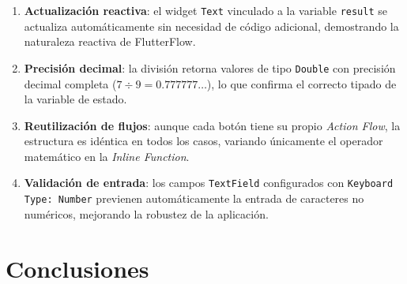 \documentclass[12pt,a4paper]{article}
\begin{document}
\begin{enumerate}
  \item \textbf{Actualización reactiva}: el widget \texttt{Text} vinculado a la variable \texttt{result} se actualiza automáticamente sin necesidad de código adicional, demostrando la naturaleza reactiva de FlutterFlow.

  \item \textbf{Precisión decimal}: la división retorna valores de tipo \texttt{Double} con precisión decimal completa ($7 \div 9 = 0.777777\ldots$), lo que confirma el correcto tipado de la variable de estado.

  \item \textbf{Reutilización de flujos}: aunque cada botón tiene su propio \textit{Action Flow}, la estructura es idéntica en todos los casos, variando únicamente el operador matemático en la \textit{Inline Function}.

  \item \textbf{Validación de entrada}: los campos \texttt{TextField} configurados con \texttt{Keyboard Type: Number} previenen automáticamente la entrada de caracteres no numéricos, mejorando la robustez de la aplicación.
\end{enumerate}

\section{Conclusiones}
\end{document}
